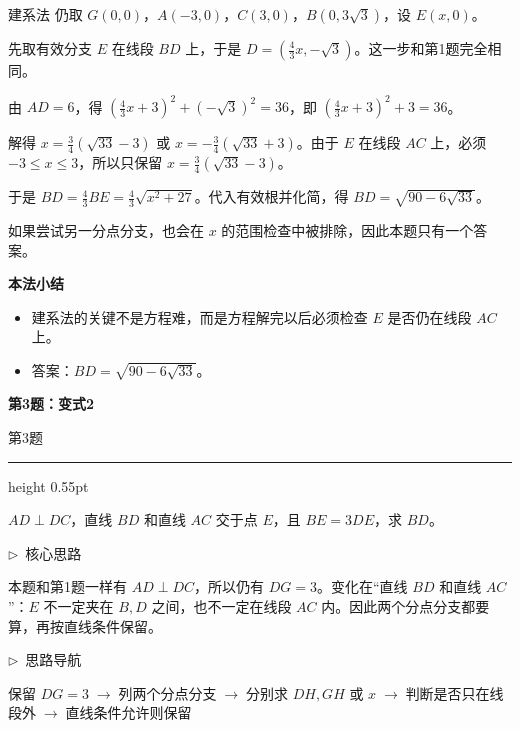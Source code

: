 \documentclass{exam-zh}
\newcommand{\edukai}{\kaishu}
\newcommand{\eduSectionTitle}[1]{%
  \needspace{5\baselineskip}%
  \vspace{2mm}
  {\color{edu-blue}\bfseries\large #1}\par
  \vspace{3mm}
}
\newenvironment{eduAuxItem}[1]{%
  \needspace{4\baselineskip}%
  \vspace{2mm}
  \par\noindent
  \hangindent=8mm\hangafter=1
  {\color{edu-blue}\edukai $\triangleright$~#1}\enspace
  \begingroup
  \color{edu-ink}
  \edukai
}{%
  \endgroup
  \par
  \vspace{4mm}
}
\newenvironment{eduProblemBlock}[1][题目]{%
  \needspace{8\baselineskip}
  {\small\color{edu-muted}#1}\par
  \vspace{1.5mm}
  {\color{edu-blue}\hrule height 0.55pt}
  \vspace{4.5mm}
  \begingroup
  \color{edu-ink}
  \large
  \setlength{\parskip}{2.2mm}
  \linespread{1.20}\selectfont
}{%
  \par
  \endgroup
  \vspace{6mm}
}
\newenvironment{eduBulletList}{%
  \begin{itemize}[
    label=\textbullet,
    leftmargin=5mm,
    itemsep=1.2mm,
    topsep=0pt,
    parsep=0pt
  ]
}{%
  \end{itemize}
}
\begin{document}
\begin{eduSolutionBox}{建系法}
  \begingroup
  \setlength{\parskip}{2.5mm}
仍取 $G(0,0)$，$A(-3,0)$，$C(3,0)$，$B(0,3\sqrt3)$，设 $E(x,0)$。\par
先取有效分支 $E$ 在线段 $BD$ 上，于是 $D=(\frac43x,-\sqrt3)$。这一步和第1题完全相同。\par
由 $AD=6$，得 $(\frac43x+3)^2+(-\sqrt3)^2=36$，即 $(\frac43x+3)^2+3=36$。\par
解得 $x=\frac34(\sqrt{33}-3)$ 或 $x=-\frac34(\sqrt{33}+3)$。由于 $E$ 在线段 $AC$ 上，必须 $-3\le x\le3$，所以只保留 $x=\frac34(\sqrt{33}-3)$。\par
于是 $BD=\frac43BE=\frac43\sqrt{x^2+27}$。代入有效根并化简，得 $BD=\sqrt{90-6\sqrt{33}}$。\par
如果尝试另一分点分支，也会在 $x$ 的范围检查中被排除，因此本题只有一个答案。\par
  \endgroup
  \vspace{2.5mm}
  {\color{edu-blue}\bfseries\small 本法小结}\par\vspace{1.5mm}
  \begin{eduBulletList}
    \item 建系法的关键不是方程难，而是方程解完以后必须检查 $E$ 是否仍在线段 $AC$ 上。    \item 答案：$BD=\sqrt{90-6\sqrt{33}}$。  \end{eduBulletList}
\end{eduSolutionBox}



\clearpage
\eduSectionTitle{第3题：变式2}

\begin{eduProblemBlock}[第3题]
$AD\perp DC$，直线 $BD$ 和直线 $AC$ 交于点 $E$，且 $BE=3DE$，求 $BD$。

\end{eduProblemBlock}





\begin{eduAuxItem}{核心思路}
本题和第1题一样有 $AD\perp DC$，所以仍有 $DG=3$。变化在“直线 $BD$ 和直线 $AC$”：$E$ 不一定夹在 $B,D$ 之间，也不一定在线段 $AC$ 内。因此两个分点分支都要算，再按直线条件保留。
\end{eduAuxItem}




\begin{eduAuxItem}{思路导航}
保留 $DG=3$$\;\to\;$列两个分点分支$\;\to\;$分别求 $DH,GH$ 或 $x$$\;\to\;$判断是否只在线段外$\;\to\;$直线条件允许则保留\end{eduAuxItem}
\end{document}
